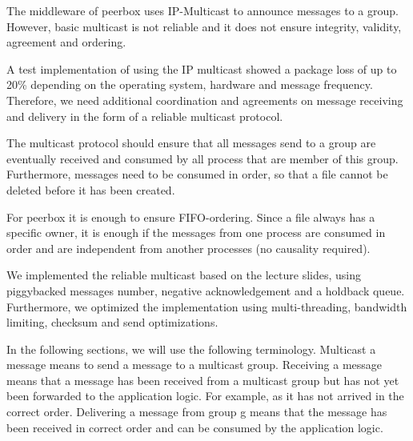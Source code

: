 The middleware of peerbox uses IP-Multicast to announce messages to a group. However, basic multicast is not reliable and it does not ensure integrity, validity, agreement and ordering.

A test implementation of using the IP multicast showed a package loss of up to 20\% depending on the operating system, hardware and message frequency. 
Therefore, we need additional coordination and agreements on message receiving and delivery in the form of a reliable multicast protocol.


The multicast protocol should ensure that all messages send to a group are eventually received and consumed by all process that are member of this group. Furthermore, messages need to be consumed in order, so that a file cannot be deleted before it has been created. 

For peerbox it is enough to ensure FIFO-ordering. Since a file always has a specific owner, it is enough if the messages from one process are consumed in order and are independent from another processes (no causality required). 

We implemented the reliable multicast based on the lecture slides, using  piggybacked messages number, negative acknowledgement and a holdback queue. Furthermore, we optimized the implementation using  multi-threading, bandwidth limiting, checksum and send optimizations. 
    
In the following sections, we will use the following terminology. Multicast a message means to send a message to a multicast group. Receiving a message means that a message has been received from a multicast group but has not yet been forwarded to the application logic. For example, as it has not arrived in the correct order. Delivering a message from group g means that the message has been received in correct order and can be consumed by the application logic.


 
% 
% 
% 
% 


